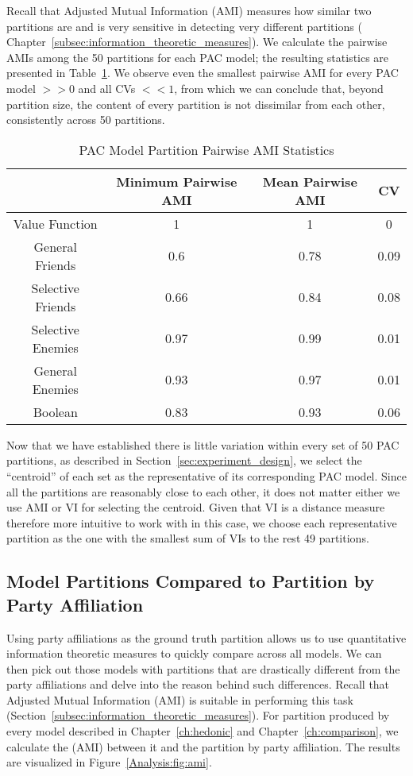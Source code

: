 Recall that Adjusted Mutual Information (AMI) measures how similar two
partitions are and is very sensitive in detecting very different partitions (
Chapter~\ref{subsec:information_theoretic_measures}).
We calculate the pairwise AMIs among the 50 partitions for each PAC model;
the resulting statistics are presented in
Table~\ref{Analysis:table:pac_pairwise_amis}.
We observe even the smallest pairwise AMI for every PAC model $>> 0$ and all CVs
$<< 1$, from which we can conclude that, beyond partition size, the content
of every partition is not dissimilar from each other, consistently across 50
partitions.

\begin{table}[h!]
\centering
\begin{tabular}{|c|c|c|c|}
\hline
       & Minimum Pairwise AMI & Mean Pairwise AMI & CV \\ \hline
Value Function & 1 & 1 & 0 \\
General Friends & 0.6 & 0.78 & 0.09  \\
Selective Friends & 0.66 & 0.84 & 0.08  \\
Selective Enemies & 0.97 & 0.99 & 0.01 \\
General Enemies & 0.93 & 0.97 & 0.01 \\
Boolean & 0.83 & 0.93 & 0.06  \\
\hline
\end{tabular}
\caption{PAC Model Partition Pairwise AMI Statistics}
\label{Analysis:table:pac_pairwise_amis}
\end{table}

Now that we have established there is little variation within every set of 50
PAC partitions, as described in Section~\ref{sec:experiment_design}, we select
the ``centroid'' of each set as the representative of its corresponding PAC model.
Since all the partitions are reasonably close to each other, it does not
matter either we use AMI or VI for selecting the centroid.
Given that VI is a distance measure therefore more intuitive to work with in
this case, we choose each representative partition as the one with the smallest
sum of VIs to the rest 49 partitions.

\subsection{Model Partitions Compared to Partition by Party Affiliation}
\label{subsec:partition_comparisons}

Using party affiliations as the ground truth partition allows us to use
quantitative information theoretic measures to quickly compare across all
models.
We can then pick out those models with partitions that are drastically
different from the party affiliations and delve into the reason behind such
differences.
Recall that Adjusted Mutual Information (AMI) is suitable in performing
this task (Section~\ref{subsec:information_theoretic_measures}).
For partition produced by every model described in Chapter~\ref{ch:hedonic} and
Chapter~\ref{ch:comparison}, we calculate the (AMI) between it and the partition
by party affiliation.
The results are visualized in Figure~\ref{Analysis:fig:ami}.

